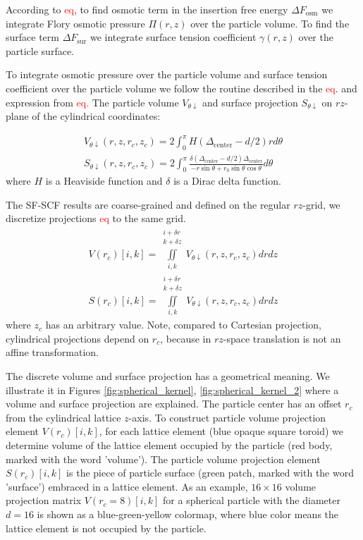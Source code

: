 \documentclass[10pt, a4paper]{article}
\newcommand\todo[1]{\textcolor{red}{#1}}
\begin{document}
\begin{multicols}{2}
According to \todo{eq}, to find osmotic term in the insertion free energy $\Delta F_{\textrm{osm}}$ we integrate Flory osmotic pressure $\Pi(r,z)$ over the particle volume.
To find the surface term $\Delta F_{\textrm{sur}}$ we integrate surface tension coefficient $\gamma(r,z)$ over the particle surface. 

To integrate osmotic pressure over the particle volume and surface tension coefficient over the particle volume we follow the routine described in the \todo{eq}. and expression from \todo{eq.}
The particle volume $V_{\theta \downarrow}$ and surface projection $S_{\theta \downarrow}$ on $rz$-plane of the cylindrical coordinates:

\begin{gather}
    V_{\theta \downarrow}(r, z, r_c, z_c) = 2\int_{0}^{\pi} H\left(\Delta_{\textrm{center}} - d/2\right) r d\theta
    \\
    S_{\theta \downarrow}(r, z, r_c, z_c) = 2\int_{0}^{\pi} \frac{\delta \left(\Delta_{\textrm{center}} - d/2\right) \Delta_{\textrm{center}}}{-r \sin \theta + r_0 \sin \theta \cos \theta} d\theta
\end{gather}
where $H$ is a Heaviside function and $\delta$ is a Dirac delta function.

The SF-SCF results are coarse-grained and defined on the regular $rz$-grid, we discretize projections \todo{eq} to the same grid.
\begin{eqnarray}
    V(r_c)[i, k] = \iint \limits_{i, k}^{\substack{i+\delta r\\ k+\delta z}} V_{\theta \downarrow} (r, z, r_c, z_c) dr dz
    \\
    S(r_c)[i, k] = \iint \limits_{i, k}^{\substack{i+\delta r\\ k+\delta z}} V_{\theta \downarrow} (r, z, r_c, z_c) dr dz
\end{eqnarray}
where $z_c$ has an arbitrary value.
Note, compared to Cartesian projection, cylindrical projections depend on $r_c$, because in $rz$-space translation is not an affine transformation.

The discrete volume and surface projection has a geometrical meaning.
We illustrate it in Figures \ref{fig:spherical_kernel}, \ref{fig:spherical_kernel_2} where a volume and surface projection are explained.
The particle center has an offset $r_c$ from the cylindrical lattice $z$-axis.
To construct particle volume projection element $V(r_c)[i,k]$, for each lattice element (blue opaque square toroid) we determine volume of the lattice element occupied by the particle (red body, marked with the word 'volume').
The particle volume projection element $S(r_c)[i,k]$ is the piece of particle surface (green patch, marked with the word 'surface') embraced in a lattice element.
As an example, $16 \times 16$ volume projection matrix $V(r_c = 8)[i,k]$ for a spherical particle with the diameter $d=16$ is shown as a blue-green-yellow colormap, where blue color means the lattice element is not occupied by the particle.


\end{multicols}
\end{document}
